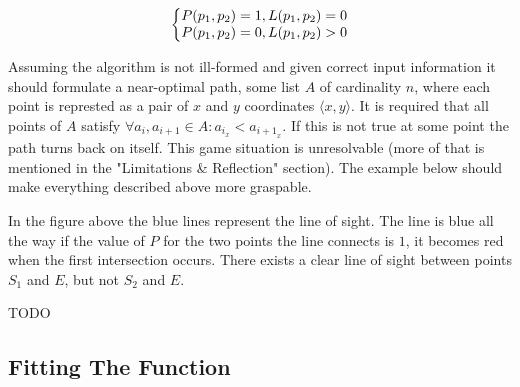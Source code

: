\documentclass[12pt, titlepage]{article}
\newcommand{\TODO}{\begin{center}\color{red}TODO\end{center}}
\begin{document}
\begin{equation}
    \left\{\begin{array}{@{}l@{}}
       P(p_1, p_2) = 1, L(p_1, p_2) = 0\\
       P(p_1, p_2) = 0, L(p_1, p_2) > 0\\
    \end{array}\right.
\end{equation}

Assuming the algorithm is not ill-formed and given correct input information
it should formulate a near-optimal path, some list $A$ of cardinality $n$, 
where each point is represted as  a pair of $x$ and $y$ coordinates 
$\langle x, y \rangle$. It is required that all points of $A$ satisfy 
$\forall a_i,a_{i+1} \in A : a_{i_x} < a_{{i+1}_x}$. If this is not true 
at some point the path turns back on itself. This game situation is unresolvable 
(more of that is mentioned in the "Limitations \& Reflection" section).
The example below should make everything described above more graspable.

\begin{center}
    
In the figure above the blue lines represent the line of sight. The line
is blue all the way if the value of $P$ for the two points the line connects
is $1$, it becomes red when the first intersection occurs. There exists
a clear line of sight between points $S_1$ and $E$, but not $S_2$ and $E$.
\TODO
\end{center}

\subsection{Fitting The Function}
\end{document}
